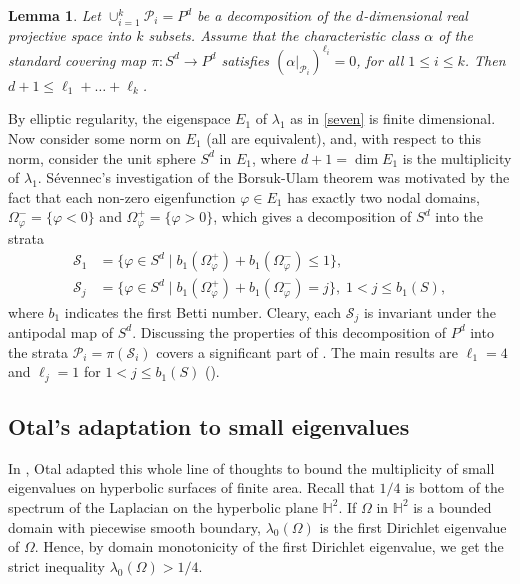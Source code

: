 \documentclass[a4paper,11pt]{amsart}
\numberwithin{equation}{section}
\newtheorem{lem}[equation]{Lemma}
\theoremstyle{definition}
\def\vf{\varphi}
\begin{document}
\begin{lem} \label{borsuk-ulam}
Let $\cup_{i=1}^k \mathcal{P}_i = P^d$ be a decomposition of the $d$-dimensional real projective space into $k$ subsets.
Assume that the characteristic class $\alpha$ of the standard covering map $\pi\colon S^d \to P^d$ satisfies $(\alpha|_{\mathcal{P}_i})^{\ell_i}=0$, for all $1\le i\le k$.
Then $d+1\le\ell_1+\dots+\ell_k$.
\end{lem}

By elliptic regularity, the eigenspace $E_1$ of $\lambda_1$ as in \cref{seven} is finite dimensional. 
Now consider some norm on $E_1$ (all are equivalent),
and, with respect to this norm, consider the unit sphere $S^d$ in $E_1$, 
where $d+1=\dim E_1$ is the multiplicity of $\lambda_1$. 
S\'{e}vennec's investigation of the Borsuk-Ulam theorem was motivated by the fact that each non-zero eigenfunction $\vf\in E_1$ has exactly two nodal domains, $\Omega_\vf^-=\{\vf<0\}$ and $ \Omega_\vf^+=\{\vf>0\}$, which gives a decomposition of $S^d$ into the strata
\begin{align*}
  \mathcal{S}_1 &= \{\vf \in S^d \mid b_1(\Omega_\vf^+) + b_1(\Omega_\vf^-) \le1 \}, \\
  \mathcal{S}_j &= \{\vf \in S^d \mid b_1(\Omega_\vf^+) + b_1(\Omega_\vf^-) = j \}, \; 1<j\le b_1(S),
\end{align*}
where $b_1$ indicates the first Betti number.
Cleary, each $\mathcal{S}_j$ is invariant under the antipodal map of $S^d$.
Discussing the properties of this decomposition of $P^d$ into the strata $\mathcal{P}_i=\pi(\mathcal{S}_i)$ covers a significant part of \cite{Se}.
The main results are $\ell_1=4$ and $\ell_j=1$ for $1<j\le b_1(S)$ (\cite[Theorem 9]{Se}).

\subsection{Otal's adaptation to small eigenvalues}\label{otal:multi}

In \cite{Ot}, Otal adapted this whole line of thoughts to bound the multiplicity of small eigenvalues on hyperbolic surfaces of finite area.
Recall that $1/4$ is bottom of the spectrum of the Laplacian on the hyperbolic plane $\mathbb{H}^2$.
If  $\Omega$ in $\mathbb{H}^2$ is a bounded domain with piecewise smooth boundary, $\lambda_0(\Omega)$ is the first Dirichlet eigenvalue of $\Omega$.
Hence, by domain monotonicity of the first Dirichlet eigenvalue, we get the strict inequality $\lambda_0(\Omega) > 1/4$.
\end{document}
